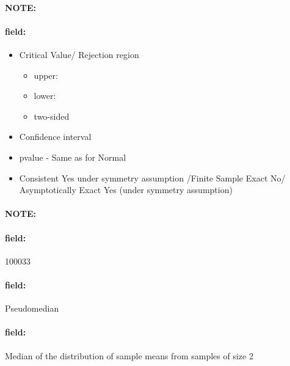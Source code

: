 \documentclass[12pt]{article}
\newenvironment{note}{\paragraph{NOTE:}}{}
\newenvironment{field}{\paragraph{field:}}{}
\begin{document}
\begin{note}
\begin{field}
\begin{itemize}
\begin{itemize}
         \end{itemize}
   \item Critical Value/ Rejection region
         \begin{itemize}
          \item upper:
          \item lower:
          \item two-sided
         \end{itemize}
   \item Confidence interval
   \item pvalue - Same as for Normal
   \item Consistent Yes under symmetry assumption /Finite Sample Exact No/ Asymptotically Exact Yes (under symmetry assumption)
  \end{itemize}
 \end{field}
\end{note}

\begin{note} \begin{field} \tiny 100033 \end{field}
 \begin{field}
  Pseudomedian
 \end{field}
 \begin{field}
  Median of the distribution of sample means from samples of size 2
 \end{field}
\end{note}
\end{document}
